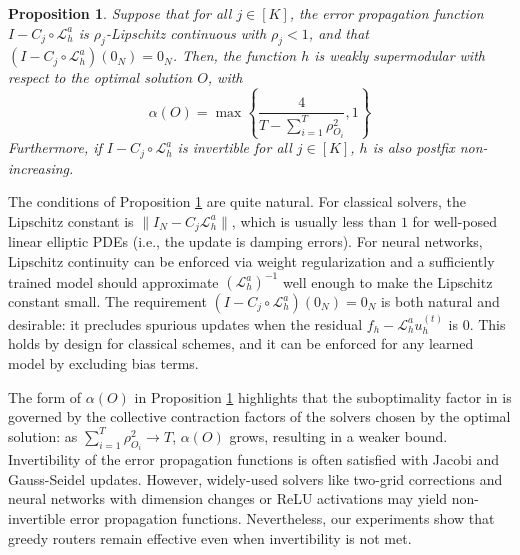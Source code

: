 \documentclass{article} %
\newtheorem{proposition}[theorem]{Proposition}
\begin{document}
\begin{proposition} \label{th:weaklyalphasupermodular}
    Suppose that for all $j \in [K]$, the error propagation function $I - C_j \circ \mathcal{L}_h^a$ is $\rho_j$-Lipschitz continuous with $\rho_j < 1$, and that $(I - C_j \circ \mathcal{L}_h^a) (0_N) = 0_N$. Then, the function $h$ is weakly supermodular with respect to the optimal solution $O$, with $$\alpha(O) = \max\left\{\frac{4}{T - \sum_{i = 1}^{T} \rho_{O_i}^2} , 1\right\}$$Furthermore, if $I - C_j \circ \mathcal{L}_h^a$ is invertible for all $j \in [K]$, $h$ is also postfix non-increasing.
\end{proposition}
The conditions of Proposition \ref{th:weaklyalphasupermodular} are quite natural. For classical solvers, the Lipschitz constant is $\|I_N - C_j \mathcal{L}^a_h\|$, which is usually less than $1$
for well-posed linear elliptic PDEs (i.e., the update is damping errors). 
For neural networks, Lipschitz continuity can be enforced via weight regularization \citep{gouk2021regularisation} and a sufficiently trained model should approximate $(\mathcal{L}^a_h)^{-1}$ well enough to make the Lipschitz constant small.
The requirement $(I - C_j \circ \mathcal{L}_h^a) (0_N) = 0_N$
is both natural and desirable: it precludes spurious updates when the residual $f_h - \mathcal{L}^a_h u_h^{(t)}$ is $0$. This holds by design for classical schemes, and it can be enforced for any learned model by excluding bias terms.

The form of $\alpha(O)$ in Proposition \ref{th:weaklyalphasupermodular} highlights that the suboptimality factor in  is governed by the collective contraction factors of the solvers chosen by the optimal solution: as $\sum_{i = 1}^{T} \rho_{O_i}^2 \to T$, $\alpha(O)$ grows, resulting in a weaker bound. 
Invertibility of the error propagation functions is often satisfied with Jacobi and Gauss-Seidel updates. However, widely-used solvers like two-grid corrections and neural networks with dimension changes or ReLU activations may yield non-invertible error propagation functions. Nevertheless, our experiments show that greedy routers remain effective even when invertibility is not met. 
\end{document}

